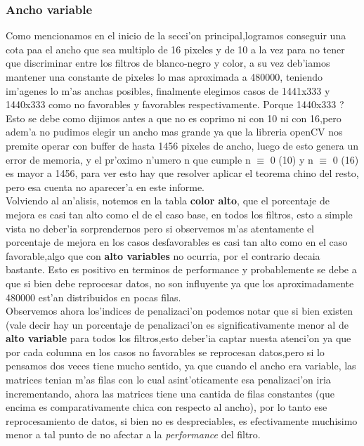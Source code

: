\subsubsection{Ancho variable}
Como mencionamos en el inicio de la secci'on principal,logramos conseguir una cota paa el ancho que sea
multiplo de 16 pixeles y de 10 a la vez para no tener que discriminar entre los filtros de blanco-negro
y color, a su vez deb'iamos mantener una constante de pixeles lo mas aproximada a 480000, 
teniendo im'agenes lo m'as anchas posibles, finalmente elegimos casos de 1441x333 y 1440x333 como no 
favorables y favorables respectivamente. \textquestiondown Porque 1440x333 ? Esto se debe como dijimos antes a que no es 
coprimo ni con 10 ni con 16,pero adem'a no pudimos elegir un ancho mas grande ya que la libreria openCV
nos premite operar con buffer de hasta 1456 pixeles de ancho, luego de esto genera un error de memoria, y
el pr'oximo n'umero n que cumple n $\equiv$ 0 (10) y n $\equiv$ 0 (16) es mayor a 1456, para ver esto hay que resolver 
aplicar el teorema chino del resto, pero esa cuenta no aparecer'a en este informe.\\
Volviendo al an'alisis, notemos en la tabla \textbf{color alto}, que el porcentaje de mejora es
casi tan alto como el de el caso base, en todos los filtros, esto a simple vista no deber'ia
 sorprendernos pero si observemos m'as atentamente el porcentaje de mejora en los casos desfavorables es 
casi tan alto como en el caso favorable,algo que con \textbf{alto variables} no ocurria, por el contrario
decaia bastante. Esto es positivo en terminos de performance y probablemente se debe a que si bien
debe reprocesar datos, no son influyente ya que los aproximadamente 480000  est'an distribuidos en
pocas filas.\\
Observemos ahora los'indices de penalizaci'on podemos notar que si bien existen (vale decir hay un porcentaje
 de penalizaci'on es significativamente menor al de \textbf{alto variable} para todos los filtros,esto
deber'ia captar nuesta atenci'on ya que por cada columna en los casos no favorables se reprocesan datos,pero
si lo pensamos dos veces tiene mucho sentido, ya que cuando el ancho era variable, las matrices
tenian m'as filas con lo cual asint'oticamente esa penalizaci'on iria incrementando, ahora las matrices
tiene una cantida de filas constantes (que encima es comparativamente chica con respecto al ancho),
por lo tanto ese reprocesamiento de datos, si bien no es despreciables, es efectivamente muchisimo menor
a tal punto de no afectar a la \textit{performance} del filtro.\\

